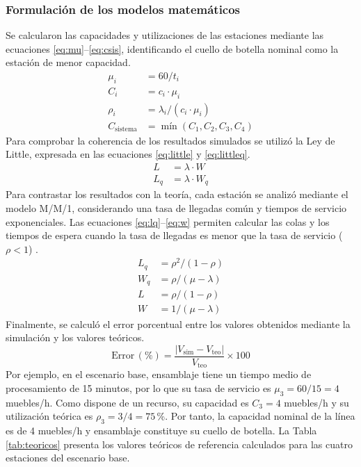 \documentclass[conference,a4paper]{IEEEtran}
\newcommand{\mn}{\mathop{\text{mín}}\nolimits}
\begin{document}
\subsubsection{Formulación de los modelos matemáticos}
Se calcularon las capacidades y utilizaciones de las estaciones mediante las ecuaciones
\eqref{eq:mu}--\eqref{eq:csis}, identificando el cuello de botella nominal como la estación
de menor capacidad.
\begin{align}
\mu_i &= 60 / t_i \label{eq:mu}\\
C_i &= c_i \cdot \mu_i \label{eq:cap}\\
\rho_i &= \lambda_i / (c_i \cdot \mu_i) \label{eq:rho}\\
C_{\mathrm{sistema}} &= \mn(C_1, C_2, C_3, C_4) \label{eq:csis}
\end{align}
Para comprobar la coherencia de los resultados simulados se utilizó la Ley de Little,
expresada en las ecuaciones \eqref{eq:little} y \eqref{eq:littleq}.
\begin{align}
L &= \lambda \cdot W \label{eq:little}\\
L_q &= \lambda \cdot W_q \label{eq:littleq}
\end{align}
Para contrastar los resultados con la teoría, cada estación se analizó mediante el modelo
M/M/1, considerando una tasa de llegadas común y tiempos de servicio exponenciales. Las
ecuaciones \eqref{eq:lq}--\eqref{eq:w} permiten calcular las colas y los tiempos de espera
cuando la tasa de llegadas es menor que la tasa de servicio ($\rho < 1$) \cite{gross2008}.
\begin{align}
L_q &= \rho^2 / (1 - \rho) \label{eq:lq}\\
W_q &= \rho / (\mu - \lambda) \label{eq:wq}\\
L &= \rho / (1 - \rho) \label{eq:l}\\
W &= 1 / (\mu - \lambda) \label{eq:w}
\end{align}
Finalmente, se calculó el error porcentual entre los valores obtenidos mediante la
simulación y los valores teóricos.
\begin{equation}
\mathrm{Error}\,(\%) = \frac{|V_{\mathrm{sim}} - V_{\mathrm{teo}}|}{V_{\mathrm{teo}}}
\times 100 \label{eq:error}
\end{equation}
Por ejemplo, en el escenario base, ensamblaje tiene un tiempo medio de procesamiento de 15
minutos, por lo que su tasa de servicio es $\mu_3 = 60/15 = 4$ muebles/h. Como dispone de un
recurso, su capacidad es $C_3 = 4$ muebles/h y su utilización teórica es $\rho_3 = 3/4 = 75$\,\%. Por tanto, la capacidad nominal de la línea es de 4 muebles/h y ensamblaje
constituye su cuello de botella. La Tabla \ref{tab:teoricos} presenta los valores teóricos de
referencia calculados para las cuatro estaciones del escenario base.
\end{document}
